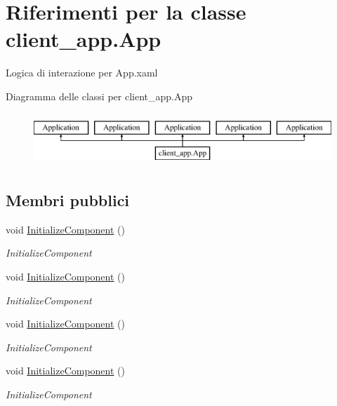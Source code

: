 \hypertarget{classclient__app_1_1_app}{}\section{Riferimenti per la classe client\+\_\+app.\+App}
\label{classclient__app_1_1_app}


Logica di interazione per App.\+xaml  


Diagramma delle classi per client\+\_\+app.\+App\begin{figure}[H]
\begin{center}
\leavevmode
\includegraphics[height=2.000000cm]{classclient__app_1_1_app}
\end{center}
\end{figure}
\subsection*{Membri pubblici}
\begin{DoxyCompactItemize}
\item 
void \mbox{\hyperlink{classclient__app_1_1_app_ab1406ddeb1d09aa8432ce1372c9e5e3d}{Initialize\+Component}} ()
\begin{DoxyCompactList}\small\item\em Initialize\+Component \end{DoxyCompactList}\item 
void \mbox{\hyperlink{classclient__app_1_1_app_ab1406ddeb1d09aa8432ce1372c9e5e3d}{Initialize\+Component}} ()
\begin{DoxyCompactList}\small\item\em Initialize\+Component \end{DoxyCompactList}\item 
void \mbox{\hyperlink{classclient__app_1_1_app_ab1406ddeb1d09aa8432ce1372c9e5e3d}{Initialize\+Component}} ()
\begin{DoxyCompactList}\small\item\em Initialize\+Component \end{DoxyCompactList}\item 
void \mbox{\hyperlink{classclient__app_1_1_app_ab1406ddeb1d09aa8432ce1372c9e5e3d}{Initialize\+Component}} ()
\begin{DoxyCompactList}\small\item\em Initialize\+Component \end{DoxyCompactList}\end{DoxyCompactItemize}
